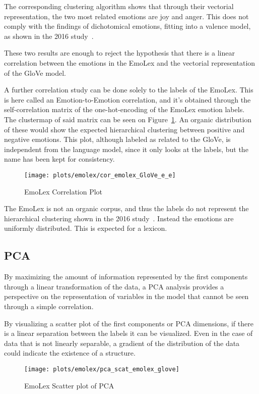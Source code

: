 The corresponding clustering algorithm shows that through their vectorial representation, the two most related emotions are joy and anger. This does not comply with the findings of dichotomical emotions, fitting into a valence model, as shown in the 2016 study~\cite{barradas2016thesis}.

These two results are enough to reject the hypothesis that there is a linear correlation between the emotions in the EmoLex and the vectorial representation of the GloVe model.


A further correlation study can be done solely to the labels of the EmoLex. This is here called an Emotion-to-Emotion correlation, and it's obtained through the self-correlation matrix of the one-hot-encoding of the EmoLex emotion labels. The clustermap of said matrix can be seen on Figure~\ref{fig:cor_emolex_GloVe_e_e}. An organic distribution of these would show the expected hierarchical clustering between positive and negative emotions. This plot, although labeled as related to the GloVe, is independent from the language model, since it only looks at the labels, but the name has been kept for consistency.

\begin{figure}[H]
  \texttt{[image: plots/emolex/cor\_emolex\_GloVe\_e\_e]}
  \centering
  \caption{EmoLex Correlation Plot}\label{fig:cor_emolex_GloVe_e_e}
\end{figure}

The EmoLex is not an organic corpus, and thus the labels do not represent the hierarchical clustering shown in the 2016 study~\cite{barradas2016thesis}. Instead the emotions are uniformly distributed. This is expected for a lexicon.

\subsection{PCA}
By maximizing the amount of information represented by the first components through a linear transformation of the data, a PCA analysis provides a perspective on the representation of variables in the model that cannot be seen through a simple correlation.

By visualizing a scatter plot of the first components or PCA dimensions, if there is a linear separation between the labels it can be visualized. Even in the case of data that is not linearly separable, a gradient of the distribution of the data could indicate the existence of a structure.

\begin{figure}[H]
  \texttt{[image: plots/emolex/pca\_scat\_emolex\_glove]}
  \centering
  \caption{EmoLex Scatter plot of PCA}\label{fig:pca_scat_emolex_glove}
\end{figure}

